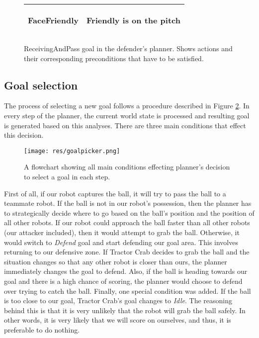 \begin{center}
\begin{figure}[H]
\begin{tabular}{ | l | p{110mm} | }
FaceFriendly &
\begin{compactitem}
\item Friendly is on the pitch
\end{compactitem}  \\ \hline
\end{tabular}
\par
\bigskip

\caption{ReceivingAndPass goal in the defender's planner. Shows actions and their corresponding preconditions that have to be satisfied.}

	\label{fig:receiveandpass}
\end{figure}
\end{center}

\subsection{Goal selection}

The process of selecting a new goal follows a procedure described in Figure
\ref{fig:goalpicker}. In every step of the planner, the current world state is
processed and resulting goal is generated based on this analyses. There are
three main conditions that effect this decision.


\begin{figure}[H]
	\begin{center}
    \texttt{[image: res/goalpicker.png]}
    \caption{A flowchart showing all main conditions effecting planner's decision to select a goal in each step.}
    \label{fig:goalpicker}
	\end{center}
\end{figure}

First of all, if our robot captures the ball, it will try to pass the ball to a
teammate robot. If the ball is not in our robot's possession, then the planner
has to strategically decide where to go based on the ball's position and the
position of all other robots. If our robot could approach the ball faster than
all other robots (our attacker included), then it would attempt to grab the
ball. Otherwise, it would switch to \emph{Defend} goal and start defending our
goal area. This involves returning to our defensive zone. If Tractor Crab
decides to grab the ball and the situation changes so that any other robot is
closer than ours, the planner immediately changes the goal to defend. Also, if
the ball is heading towards our goal and there is a high chance of scoring, the
planner would choose to defend over trying to catch the ball. Finally, one
special condition was added. If the ball is too close to our goal, Tractor
Crab's goal changes to \emph{Idle}. The reasoning behind this is that it is
very unlikely that the robot will grab the ball safely. In other words, it is
very likely that we will score on ourselves, and thus, it is preferable to do
nothing.


